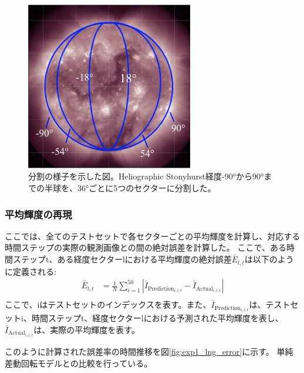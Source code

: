         \begin{figure}[htbp]
          \centering
          \includegraphics[width=0.65\textwidth]{figures/exp1/devision_caption.jpg}
          \caption{分割の様子を示した図。Heliographic Stonyhurst経度-90°から90°までの半球を、36°ごとに5つのセクターに分割した。}
          \label{fig:exp1_division_concept}
        \end{figure}

        \subsubsection{平均輝度の再現}
          ここでは、全てのテストセットで各セクターごとの平均輝度を計算し、対応する時間ステップの実際の観測画像との間の絶対誤差を計算した。
          ここで、ある時間ステップt、ある経度セクターlにおける平均輝度の絶対誤差\( \bar{E}_{l,t} \)は以下のように定義される:
          \begin{align}
            \bar{E}_{l, t} & = \frac{1}{N} \sum_{i=1}^{50} | \bar{I}_{\text{Prediction}_ {i, l, t}} - \bar{I}_{\text{Actual}_{i, l, t}} | \\
          \end{align}
          ここで、iはテストセットのインデックスを表す。また、\( \bar{I}_{\text{Prediction}_{i, l, t}} \)は、テストセットi、時間ステップt、経度セクターlにおける予測された平均輝度を表し、\( \bar{I}_{\text{Actual}_{i, l, t}} \)は、実際の平均輝度を表す。  
            
          このように計算された誤差率の時間推移を図\ref{fig:exp1_lng_error}に示す。
          単純差動回転モデルとの比較を行っている。
          
